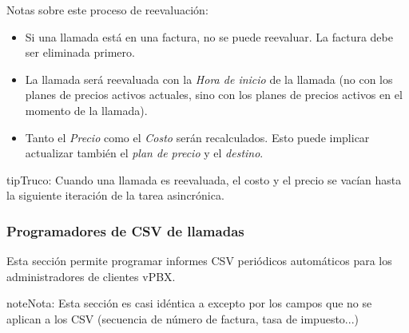 \documentclass[letterpaper,10pt,spanish]{sphinxmanual}
\begin{document}
Notas sobre este proceso de reevaluación:
\begin{itemize}
\item {} 
Si una llamada está en una factura, no se puede reevaluar. La factura debe ser eliminada primero.

\item {} 
La llamada será reevaluada con la \emph{Hora de inicio} de la llamada (no con los planes de precios activos actuales, sino con los planes de precios activos en el momento de la llamada).

\item {} 
Tanto el \emph{Precio} como el \emph{Costo} serán recalculados. Esto puede implicar actualizar también el \emph{plan de precio} y el \emph{destino}.

\end{itemize}

\begin{notice}{tip}{Truco:}
Cuando una llamada es reevaluada, el costo y el precio se vacían hasta la siguiente iteración de la tarea asincrónica.
\end{notice}


\subsubsection{Programadores de CSV de llamadas}
\label{administration_portal/client/vpbx/calls/call_csv_schedulers:call-csv-schedulers}\label{administration_portal/client/vpbx/calls/call_csv_schedulers::doc}
Esta sección permite programar informes CSV periódicos automáticos para los administradores de clientes vPBX.

\begin{notice}{note}{Nota:}
Esta sección es casi idéntica a {\hyperref[administration_portal/brand/invoicing/invoice_schedulers:invoice\string-schedulers]{}} excepto por los campos que no se aplican a los CSV (secuencia de número de factura, tasa de impuesto...)
\end{notice}
\end{document}
